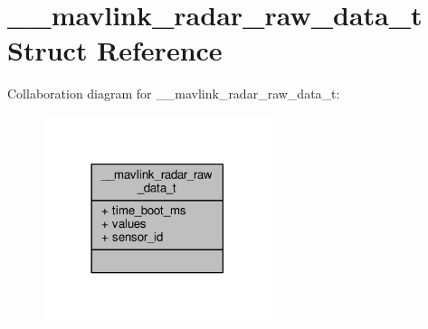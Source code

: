 \hypertarget{struct____mavlink__radar__raw__data__t}{\section{\+\_\+\+\_\+mavlink\+\_\+radar\+\_\+raw\+\_\+data\+\_\+t Struct Reference}
\label{struct____mavlink__radar__raw__data__t}
}


Collaboration diagram for \+\_\+\+\_\+mavlink\+\_\+radar\+\_\+raw\+\_\+data\+\_\+t\+:
\nopagebreak
\begin{figure}[H]
\begin{center}
\leavevmode
\includegraphics[width=189pt]{struct____mavlink__radar__raw__data__t__coll__graph}
\end{center}
\end{figure}
